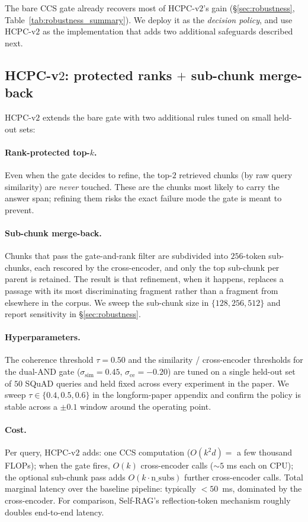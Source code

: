 The bare CCS gate already recovers most of HCPC-v$2$'s gain
(\S\ref{sec:robustness}, Table~\ref{tab:robustness_summary}). We deploy it as the
\emph{decision policy}, and use HCPC-v$2$ as the implementation that
adds two additional safeguards described next.

\subsection{HCPC-v$2$: protected ranks $+$ sub-chunk merge-back}
\label{sec:method:hcpc_v2}

HCPC-v$2$ extends the bare gate with two additional rules tuned on
small held-out sets:

\paragraph{Rank-protected top-$k$.}
Even when the gate decides to refine, the top-$2$ retrieved chunks
(by raw query similarity) are \emph{never} touched. These are the
chunks most likely to carry the answer span; refining them risks the
exact failure mode the gate is meant to prevent.

\paragraph{Sub-chunk merge-back.}
Chunks that pass the gate-and-rank filter are subdivided into
$256$-token sub-chunks, each rescored by the cross-encoder, and only
the top sub-chunk per parent is retained. The result is that
refinement, when it happens, replaces a passage with its most
discriminating fragment rather than a fragment from elsewhere in the
corpus. We sweep the sub-chunk size in $\{128, 256, 512\}$ and report
sensitivity in \S\ref{sec:robustness}.

\paragraph{Hyperparameters.}
The coherence threshold $\tau = 0.50$ and the similarity / cross-encoder
thresholds for the dual-AND gate ($\sigma_{\textrm{sim}} = 0.45$,
$\sigma_{\textrm{ce}} = -0.20$) are tuned on a single held-out
set of $50$ SQuAD queries and held fixed across every experiment in the
paper. We sweep $\tau \in \{0.4, 0.5, 0.6\}$ in
the longform-paper appendix and confirm the policy is stable
across a $\pm 0.1$ window around the operating point.

\paragraph{Cost.}
Per query, HCPC-v$2$ adds: one CCS computation
($O(k^2 d) = $ a few thousand FLOPs); when the gate fires, $O(k)$
cross-encoder calls ($\sim 5$ ms each on CPU); the optional
sub-chunk pass adds $O(k \cdot \textrm{n\_subs})$ further cross-encoder
calls. Total marginal latency over the baseline pipeline: typically
$<50$~ms, dominated by the cross-encoder. For comparison, Self-RAG's
reflection-token mechanism roughly doubles end-to-end latency.

